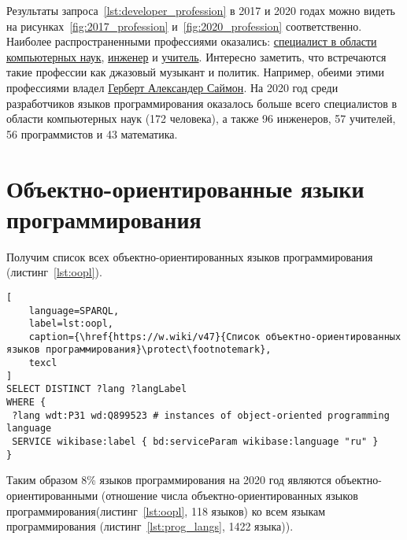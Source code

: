 Результаты запроса~\ref{lst:developer_profession} в 2017 и 2020 годах можно видеть на рисунках~\ref{fig:2017_profession} и~\ref{fig:2020_profession} соответственно.
Наиболее распространенными профессиями оказались: \href{https://www.wikidata.org/wiki/Q21198}{специалист в области компьютерных наук}, \href{https://www.wikidata.org/wiki/Q81096}{инженер} и \href{https://www.wikidata.org/wiki/Q37226}{учитель}. Интересно заметить, что встречаются такие профессии как джазовый музыкант и политик. Например, обеими этими профессиями владел \href{https://www.wikidata.org/wiki/Q181529}{Герберт Александер Саймон}. На 2020 год среди разработчиков языков программирования оказалось больше всего специалистов в области компьютерных наук (172 человека), а также 96 инженеров, 57 учителей, 56 программистов и 43 математика.

\section{Объектно-ориентированные языки программирования}
Получим список всех объектно-ориентированных языков программирования (листинг~\ref{lst:oopl}).

\begin{lstlisting}[
	language=SPARQL,
	label=lst:oopl,
	caption={\href{https://w.wiki/v47}{Список объектно-ориентированных языков программирования}\protect\footnotemark},
	texcl
]
SELECT DISTINCT ?lang ?langLabel
WHERE {
 ?lang wdt:P31 wd:Q899523 # instances of object-oriented programming language
 SERVICE wikibase:label { bd:serviceParam wikibase:language "ru" }
}
\end{lstlisting}

Таким образом 8\% языков программирования на 2020 год являются объектно-ориентированными (отношение числа объектно-ориентированных языков программирования(листинг~\ref{lst:oopl}, 118 языков) ко всем языкам программирования (листинг~\ref{lst:prog_langs}, 1422 языка)).

